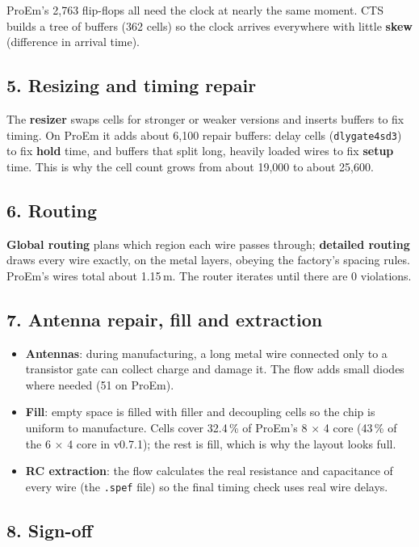 \documentclass[11pt,a4paper]{article}
\newcommand{\file}[1]{\texttt{#1}}
\begin{document}
ProEm's 2,763 flip-flops all need the clock at nearly the same moment. CTS builds a tree of buffers (362 cells) so the clock arrives everywhere with little \textbf{skew} (difference in arrival time).

\subsection{5. Resizing and timing repair}

The \textbf{resizer} swaps cells for stronger or weaker versions and inserts buffers to fix timing. On ProEm it adds about 6,100 repair buffers: delay cells (\texttt{dlygate4sd3}) to fix \textbf{hold} time, and buffers that split long, heavily loaded wires to fix \textbf{setup} time. This is why the cell count grows from about 19,000 to about 25,600.

\subsection{6. Routing}

\textbf{Global routing} plans which region each wire passes through; \textbf{detailed routing} draws every wire exactly, on the metal layers, obeying the factory's spacing rules. ProEm's wires total about 1.15\,m. The router iterates until there are 0 violations.

\subsection{7. Antenna repair, fill and extraction}

\begin{itemize}
\item \textbf{Antennas}: during manufacturing, a long metal wire connected only to a transistor gate can collect charge and damage it. The flow adds small diodes where needed (51 on ProEm).
\item \textbf{Fill}: empty space is filled with filler and decoupling cells so the chip is uniform to manufacture. Cells cover 32.4\,\% of ProEm's 8 $\times$ 4 core (43\,\% of the 6 $\times$ 4 core in v0.7.1); the rest is fill, which is why the layout looks full.
\item \textbf{RC extraction}: the flow calculates the real resistance and capacitance of every wire (the \file{.spef} file) so the final timing check uses real wire delays.
\end{itemize}

\subsection{8. Sign-off}
\end{document}
